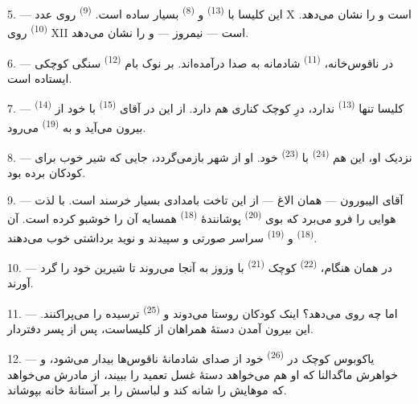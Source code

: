 \VUsaut{3.4mm}
\VUsaut{3.0mm}

5. --- این کلیسا با  \textsuperscript{(13)} و
 \textsuperscript{(8)} بسیار ساده است.
 \textsuperscript{(9)} روی عدد X است و
 را نشان می‌دهد. 
\textsuperscript{(10)} روی XII است — نیمروز — و  را نشان
می‌دهد.

6. --- در ناقوس‌خانه،  \textsuperscript{(11)} شادمانه
به صدا درآمده‌اند. بر نوک بام  \textsuperscript{(12)}
سنگی کوچکی ایستاده است.

7. --- کلیسا تنها  \textsuperscript{(13)} ندارد، درِ
کوچک کناری هم دارد. از این در آقای  \textsuperscript{(15)}
با  خود از  \textsuperscript{(14)} بیرون
می‌آید و به  \textsuperscript{(19)} می‌رود.

8. --- نزدیک او، این هم  \textsuperscript{(24)} با
 \textsuperscript{(23)} خود. او از شهر بازمی‌گردد، جایی که
شیر خوب برای کودکان برده بود.

\VUsaut{4.0mm}
\VUsaut{3.4mm}

9. --- آقای الیبورون — همان الاغ — از این تاخت بامدادی بسیار خرسند
است. با لذت هوایی را فرو می‌برد که بوی 
\textsuperscript{(20)} پوشانندهٔ 
\textsuperscript{(18)}  همسایه آن را خوشبو کرده است.
آن  \textsuperscript{(18)} و 
\textsuperscript{(19)} سراسر صورتی و سپیدند و نوید برداشتی خوب می‌دهند.

10. --- در همان هنگام،  \textsuperscript{(22)} کوچک
 \textsuperscript{(21)} با وزوز به آنجا می‌روند تا
 شیرین خود را گرد آورند.

11. --- اما چه روی می‌دهد؟ اینک کودکان روستا می‌دوند و
 \textsuperscript{(25)} ترسیده را می‌پراکنند. این بیرون
آمدن دستهٔ همراهان از کلیساست، پس از  پسر
دفتردار.

12. --- یاکوبوس کوچک در  \textsuperscript{(26)} خود از
صدای شادمانهٔ ناقوس‌ها بیدار می‌شود، و خواهرش ماگدالنا که او هم
می‌خواهد دستهٔ غسل تعمید را ببیند، از مادرش می‌خواهد که موهایش را شانه
کند و لباسش را بر آستانهٔ خانه بپوشاند.

